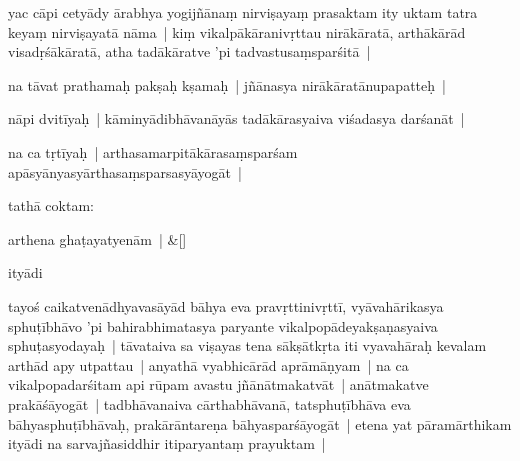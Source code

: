 \documentclass[article,12pt,a4paper]{memoir}%
\newcounter{parCount}
\begin{document}
	  \pstart \leavevmode%
	\label{thakur75-20.23}yac cāpi cetyādy ārabhya yogijñānaṃ nirviṣayaṃ prasaktam ity uktam tatra keyaṃ nirviṣayatā nāma | kiṃ vikalpākāranivṛttau nirākāratā, arthākārād visadṛśākāratā, atha tadākāratve 'pi tadvastusaṃsparśitā | 
	{}
	\pend%
      

	  \pstart \leavevmode%
	na tāvat prathamaḥ pakṣaḥ kṣamaḥ | jñānasya nirākāratānupapatteḥ | 
	{}
	\pend%
      

	  \pstart \leavevmode%
	nāpi dvitīyaḥ | kāminyādibhāvanāyās tadākārasyaiva viśadasya darśanāt | 
	{}
	\pend%
      

	  \pstart \leavevmode%
	na ca tṛtīyaḥ | arthasamarpitākārasaṃsparśam apāsyānyasyārthasaṃsparsasyāyogāt | 
	{}
	\pend%
      

	  \pstart \leavevmode%
	tathā coktam:
	{}
	\pend%
      
	    
	    \stanza[\smallbreak]
	  arthena ghaṭayatyenām | \&[\smallbreak]
	  
	  
	  

	  \pstart \leavevmode%
	ityādi
	{}
	\pend%
      

	  \pstart \leavevmode%
	tayoś caikatvenādhyavasāyād bāhya eva pravṛttinivṛttī, vyāvahārikasya sphuṭībhāvo 'pi bahirabhimatasya paryante vikalpopādeyakṣaṇasyaiva sphuṭasyodayaḥ | tāvataiva sa viṣayas tena sākṣātkṛta iti vyavahāraḥ kevalam arthād apy utpattau | anyathā vyabhicārād aprāmāṇyam | na ca vikalpopadarśitam api rūpam avastu jñānātmakatvāt | anātmakatve prakāśāyogāt | tadbhāvanaiva cārthabhāvanā, tatsphuṭībhāva eva bāhyasphuṭībhāvaḥ, prakārāntareṇa bāhyasparśāyogāt | etena yat pāramārthikam ityādi na sarvajñasiddhir itiparyantaṃ prayuktam | 
	{}
	\pend%
      
\end{document}

